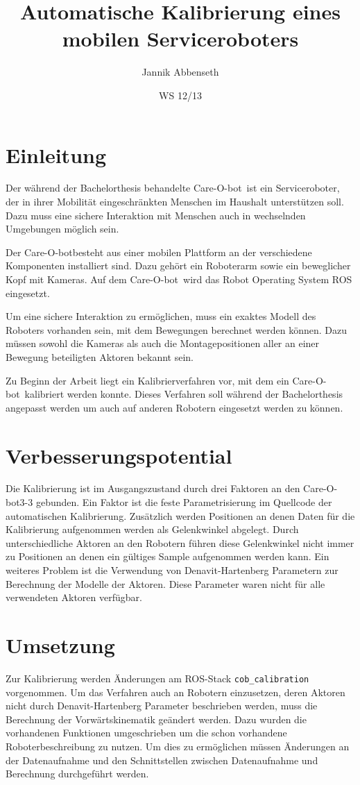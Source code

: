 \documentclass{scrartcl}
\title{Automatische Kalibrierung eines mobilen Serviceroboters}
\author{Jannik Abbenseth}
\date{WS 12/13}
\newcommand{\cob}{Care-O-bot}
\begin{document}
 
\maketitle
\section{Einleitung}

Der während der Bachelorthesis behandelte \cob\ ist ein Serviceroboter, der
in ihrer Mobilität eingeschränkten Menschen im Haushalt unterstützen soll. 
Dazu muss eine sichere Interaktion mit Menschen auch in wechselnden Umgebungen
möglich sein.

Der \cob besteht aus einer mobilen Plattform an der verschiedene Komponenten 
installiert sind. Dazu gehört ein Roboterarm sowie ein beweglicher Kopf mit 
Kameras. Auf dem \cob\ wird das Robot Operating System ROS eingesetzt. 

Um eine sichere Interaktion zu ermöglichen, muss ein exaktes Modell des 
Roboters vorhanden sein, mit dem Bewegungen berechnet werden können.
Dazu müssen sowohl die Kameras als auch die Montagepositionen aller an einer
Bewegung beteiligten Aktoren bekannt sein.

Zu Beginn der Arbeit liegt ein Kalibrierverfahren vor, mit dem ein \cob\ 
kalibriert werden konnte. Dieses Verfahren soll während der Bachelorthesis
angepasst werden um auch auf anderen Robotern eingesetzt werden zu können.


\section{Verbesserungspotential}
\label{sec:Verbesserungspotential}

Die Kalibrierung ist im Ausgangszustand durch drei Faktoren an den \cob3-3 
gebunden. Ein Faktor ist die feste Parametrisierung im Quellcode der
automatischen Kalibrierung. Zusätzlich werden Positionen an denen Daten für 
die Kalibrierung aufgenommen werden als Gelenkwinkel abgelegt. Durch 
unterschiedliche Aktoren an den Robotern führen diese Gelenkwinkel nicht immer
zu Positionen an denen ein gültiges Sample aufgenommen werden kann. Ein weiteres
Problem ist die Verwendung von Denavit-Hartenberg Parametern zur Berechnung der
Modelle der Aktoren. Diese Parameter waren nicht für alle verwendeten Aktoren
verfügbar.

\section{Umsetzung}
Zur Kalibrierung werden Änderungen am ROS-Stack \texttt{cob\_calibration}
vorgenommen. Um das Verfahren auch an Robotern einzusetzen, deren Aktoren nicht 
durch Denavit-Hartenberg Parameter beschrieben werden, muss die Berechnung der
Vorwärtskinematik geändert werden. Dazu wurden die vorhandenen Funktionen 
umgeschrieben um die schon vorhandene Roboterbeschreibung zu nutzen. Um dies
zu ermöglichen müssen Änderungen an der Datenaufnahme und den Schnittstellen
zwischen Datenaufnahme und Berechnung durchgeführt werden.
\end{document}
